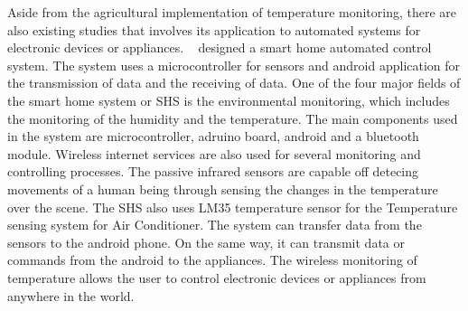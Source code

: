 Aside from the agricultural implementation of temperature monitoring, there are also existing studies that involves its application to automated systems for electronic devices or appliances.
~\cite{Mohamed} designed a smart home automated control system. The system uses a microcontroller for sensors and android application for the transmission of data and the receiving of data. One of the four major fields of the smart home system or SHS is the environmental monitoring, which includes the monitoring of the humidity and the temperature. The main components used in the system are microcontroller, adruino board, android and a bluetooth module. Wireless internet services are also used for several monitoring and controlling processes. The passive infrared sensors are capable off detecing movements of a human being through sensing the changes in the temperature over the scene. The SHS also uses LM35 temperature sensor for the Temperature sensing system for Air Conditioner. The system can transfer data from the sensors to the android phone. On the same way, it can transmit data or commands from the android to the appliances. The wireless monitoring of temperature allows the user to control electronic devices or appliances from anywhere in the world.



